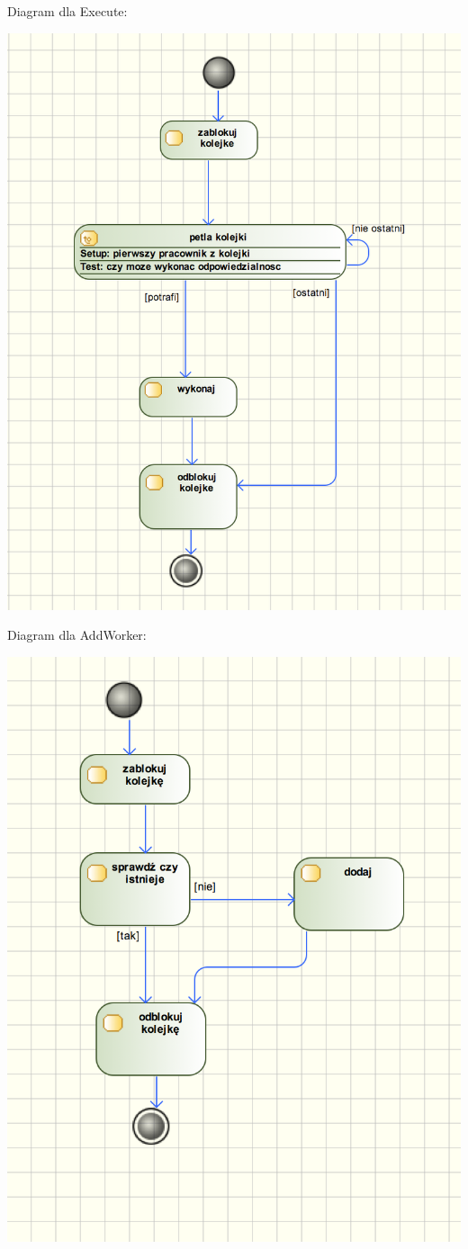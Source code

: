 \documentclass[paper=a4, fontsize=11pt]{scrartcl} %
\numberwithin{equation}{section} %
\numberwithin{figure}{section} %
\numberwithin{table}{section} %
\begin{document}
Diagram dla Execute:

\includegraphics[width=\textwidth]{3}

Diagram dla AddWorker:

\includegraphics[width=\textwidth]{4}
\end{document}
